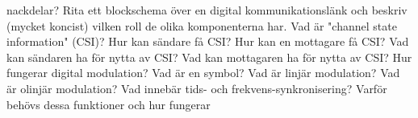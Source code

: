 \documentclass[a4paper,11pt]{article}
\begin{document}
nackdelar?
\newline
\newline
Rita ett blockschema över en digital kommunikationslänk och beskriv (mycket 
koncist) vilken roll de olika komponenterna har.
\newline
\newline
Vad är "channel state information" (CSI)? Hur kan sändare få CSI? Hur kan en 
mottagare få CSI? Vad kan sändaren ha för nytta av CSI? Vad kan mottagaren ha för nytta av
CSI?
\newline
\newline
Hur fungerar digital modulation? Vad är en symbol?  Vad är linjär modulation? Vad 
är olinjär modulation?
\newline
\newline
Vad innebär tids- och frekvens-synkronisering? Varför behövs dessa funktioner och 
hur fungerar
 
\end{document}
